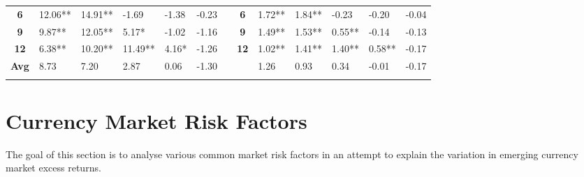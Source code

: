 \documentclass{article}
\begin{document}
\begin{table}[htbp!]
\begin{adjustwidth}{-1.25cm}{}
\begin{tabular}{rrrrrrrrrrrrr}
    \multicolumn{1}{c}{\textbf{6}} & \multicolumn{1}{l}{12.06**} & \multicolumn{1}{l}{14.91**} & \multicolumn{1}{l}{-1.69} & \multicolumn{1}{l}{-1.38} & \multicolumn{1}{l}{-0.23} &       & \multicolumn{1}{c}{\textbf{6}} & \multicolumn{1}{l}{1.72**} & \multicolumn{1}{l}{1.84**} & \multicolumn{1}{l}{-0.23} & \multicolumn{1}{l}{-0.20} & \multicolumn{1}{l}{-0.04} \\
    \multicolumn{1}{c}{\textbf{9}} & \multicolumn{1}{l}{9.87**} & \multicolumn{1}{l}{12.05**} & \multicolumn{1}{l}{5.17*} & \multicolumn{1}{l}{-1.02} & \multicolumn{1}{l}{-1.16} &       & \multicolumn{1}{c}{\textbf{9}} & \multicolumn{1}{l}{1.49**} & \multicolumn{1}{l}{1.53**} & \multicolumn{1}{l}{0.55**} & \multicolumn{1}{l}{-0.14} & \multicolumn{1}{l}{-0.13} \\
    \multicolumn{1}{c}{\textbf{12}} & \multicolumn{1}{l}{6.38**} & \multicolumn{1}{l}{10.20**} & \multicolumn{1}{l}{11.49**} & \multicolumn{1}{l}{4.16*} & \multicolumn{1}{l}{-1.26} &       & \multicolumn{1}{c}{\textbf{12}} & \multicolumn{1}{l}{1.02**} & \multicolumn{1}{l}{1.41**} & \multicolumn{1}{l}{1.40**} & \multicolumn{1}{l}{0.58**} & \multicolumn{1}{l}{-0.17} \\
\cmidrule{2-6}\cmidrule{9-13}    \multicolumn{1}{c}{\textbf{Avg}} & \multicolumn{1}{l}{8.73} & \multicolumn{1}{l}{7.20} & \multicolumn{1}{l}{2.87} & \multicolumn{1}{l}{0.06} & \multicolumn{1}{l}{-1.30} &       &       & \multicolumn{1}{l}{1.26} & \multicolumn{1}{l}{0.93} & \multicolumn{1}{l}{0.34} & \multicolumn{1}{l}{-0.01} & \multicolumn{1}{l}{-0.17} \\
    \midrule
          &       &       &       &       &       &       &       &       &       &       &       &  \\
    \end{tabular}%
    \end{adjustwidth}
  \label{WTCR}%
\end{table}%


\newpage
\section{Currency Market Risk Factors}

The goal of this section is to analyse various common market risk factors in an attempt to explain the variation in emerging currency market excess returns.\\
\end{document}

